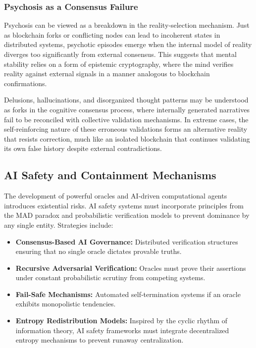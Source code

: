 \documentclass[11pt]{article}
\begin{document}
\subsubsection{Psychosis as a Consensus Failure}
Psychosis can be viewed as a breakdown in the reality‐selection mechanism. Just as blockchain forks or conflicting nodes can lead to incoherent states in distributed systems, psychotic episodes emerge when the internal model of reality diverges too significantly from external consensus. This suggests that mental stability relies on a form of epistemic cryptography, where the mind verifies reality against external signals in a manner analogous to blockchain confirmations.

Delusions, hallucinations, and disorganized thought patterns may be understood as forks in the cognitive consensus process, where internally generated narratives fail to be reconciled with collective validation mechanisms. In extreme cases, the self‐reinforcing nature of these erroneous validations forms an alternative reality that resists correction, much like an isolated blockchain that continues validating its own false history despite external contradictions.

\subsection{AI Safety and Containment Mechanisms}
The development of powerful oracles and AI‐driven computational agents introduces existential risks. AI safety systems must incorporate principles from the MAD paradox and probabilistic verification models to prevent dominance by any single entity. Strategies include:
\begin{itemize}
    \item \textbf{Consensus-Based AI Governance:} Distributed verification structures ensuring that no single oracle dictates provable truths.
    \item \textbf{Recursive Adversarial Verification:} Oracles must prove their assertions under constant probabilistic scrutiny from competing systems.
    \item \textbf{Fail-Safe Mechanisms:} Automated self‐termination systems if an oracle exhibits monopolistic tendencies.
    \item \textbf{Entropy Redistribution Models:} Inspired by the cyclic rhythm of information theory, AI safety frameworks must integrate decentralized entropy mechanisms to prevent runaway centralization.
\end{itemize}
\end{document}
